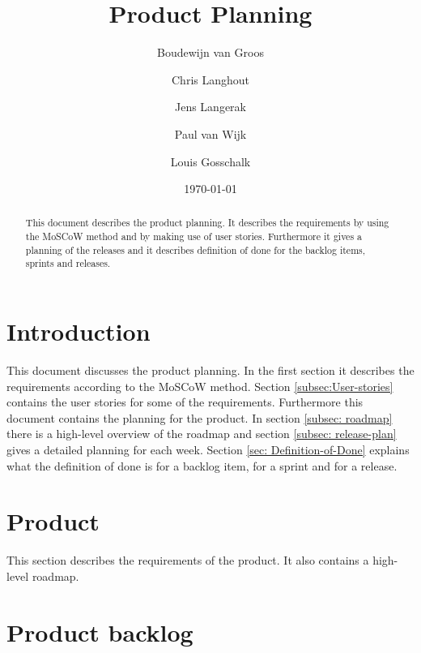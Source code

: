 \documentclass[a4paper]{article}
\title{Product Planning}
\author[1]{Boudewijn van Groos}
\author[2]{Chris Langhout}
\author[3]{Jens Langerak}
\author[4]{Paul van Wijk}
\author[5]{Louis Gosschalk}
\affil[1]{bvangroos \\
	4229843}
\affil[2]{clanghout \\
	4281705}
\affil[3]{jlangerak \\
	4317327}
\affil[4]{pjvanwijk \\
	4285034}
\affil[5]{lgosschalk \\
	4214528}
\date{\today}
\begin{document}
\maketitle
\begin{abstract}
	This document describes the product planning. It describes the requirements by using the MoSCoW method and by making use of user stories. Furthermore it gives a planning of the releases and it describes definition of done for the backlog items, sprints and releases.
\end{abstract}
\newpage
\tableofcontents
\newpage

\section{Introduction}
This document discusses the product planning. In the first section it describes the requirements according to the MoSCoW method. Section \ref{subsec:User-stories} contains the user stories for some of the requirements. Furthermore this document contains the planning for the product. In section \ref{subsec: roadmap} there is a high-level overview of the roadmap and section \ref{subsec: release-plan} gives a detailed planning for each week. Section \ref{sec: Definition-of-Done} explains what the definition of done is for a backlog item, for a sprint and for a release. 
\section{Product}
This section describes the requirements of the product. It also contains a high-level roadmap.


\section{Product backlog}



\end{document}

